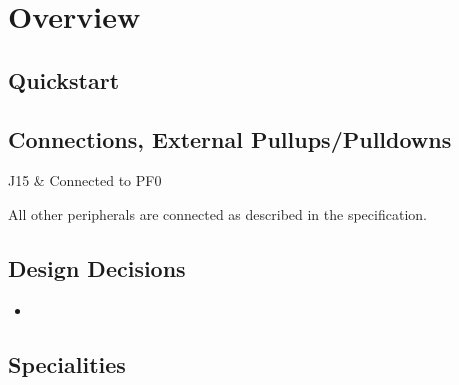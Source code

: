 \documentclass[12pt,a4paper,titlepage,oneside]{article}
\begin{document}
\MakeTitleAndTOC




\section{Overview}

\subsection{Quickstart}


\subsection{Connections,  External Pullups/Pulldowns}

J15 & Connected to PF0 \\
\eConnections

All other peripherals are connected as described in the specification.

\subsection{Design Decisions}

\begin{itemize}

 \item
 
\end{itemize}


\subsection{Specialities}
\end{document}
